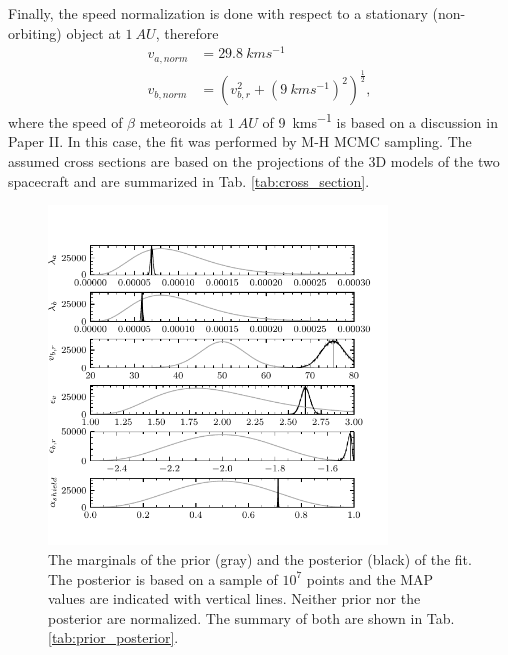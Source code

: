 Finally, the speed normalization is done with respect to a stationary (non-orbiting) object at $\SI{1}{AU}$, therefore
\begin{equation}\begin{split}
    v_{a,norm} & = \SI{29.8}{kms^{-1}} \\
    v_{b,norm} & = \left( v_{b,r}^2 + \left(\SI{9}{kms^{-1}}\right)^2 \right)^\frac{1}{2},
\end{split}\end{equation}
where the speed of $\beta$ meteoroids at $\SI{1}{AU}$ of \SI{9}{kms^{-1}} is based on a discussion in Paper II. In this case, the fit was performed by M-H MCMC sampling. The assumed cross sections are based on the projections of the 3D models \citep{psp_model,solo_model} of the two spacecraft and are summarized in Tab. \ref{tab:cross_section}.

\begin{figure}[t]
 	\centering
 	\includegraphics[width=9cm]{figures/both_shield.pdf}
 	\caption{The marginals of the prior (gray) and the posterior (black) of the fit. The posterior is based on a sample of $10^7$ points and the MAP values are indicated with vertical lines. Neither prior nor the posterior are normalized. The summary of both are shown in Tab. \ref{tab:prior_posterior}.}
 	\label{fig:fit_posteriors}
\end{figure}

